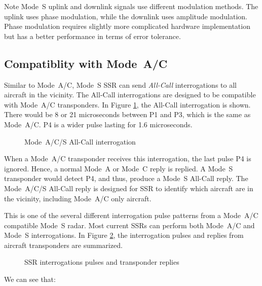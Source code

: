 \begin{notebox}{Note}
  Mode~S uplink and downlink signals use different modulation methods. The uplink uses phase modulation, while the downlink uses amplitude modulation. Phase modulation requires slightly more complicated hardware implementation but has a better performance in terms of error tolerance. 
\end{notebox}

\subsection{Compatiblity with Mode~A/C}

Similar to Mode~A/C, Mode~S SSR can send \emph{All-Call} interrogations to all aircraft in the vicinity. The All-Call interrogations are designed to be compatible with Mode~A/C transponders. In Figure \ref{fig:mode_s_all_call}, the All-Call interrogation is shown. There would be 8 or 21 microseconds between P1 and P3, which is the same as Mode~A/C. P4 is a wider pulse lasting for 1.6 microseconds.

\begin{figure}[ht]
  \scalebox{0.9}{
    
  }
  \caption{Mode~A/C/S All-Call interrogation}
  \label{fig:mode_s_all_call}
\end{figure}

When a Mode~A/C transponder receives this interrogation, the last pulse P4 is ignored. Hence, a normal Mode~A or Mode~C reply is replied. A Mode~S transponder would detect P4, and thus, produce a Mode~S All-Call reply. The Mode~A/C/S All-Call reply is designed for SSR to identify which aircraft are in the vicinity, including Mode~A/C only aircraft.

This is one of the several different interrogation pulse patterns from a Mode~A/C compatible Mode~S radar. Most current SSRs can perform both Mode~A/C and Mode~S interrogations. In Figure \ref{fig:mode_s_inter_mode}, the interrogation pulses and replies from aircraft transponders are summarized.

\begin{figure}[ht]
  \scalebox{0.9}{
    
  }
  \caption{SSR interrogations pulses and transponder replies}
  \label{fig:mode_s_inter_mode}
\end{figure}

We can see that:

